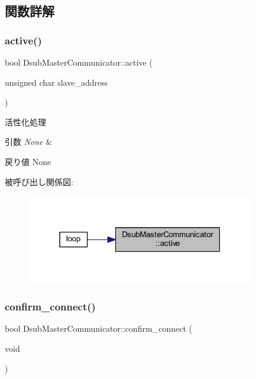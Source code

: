 \subsection{関数詳解}
\mbox{\label{class_dsub_master_communicator_a326013bfa0efeba26958317ce38706ac}} 
\subsubsection{\texorpdfstring{active()}{active()}}
{\footnotesize\ttfamily bool Dsub\+Master\+Communicator\+::active (\begin{DoxyParamCaption}\item[{unsigned char}]{slave\+\_\+address }\end{DoxyParamCaption})}



活性化処理 


\begin{DoxyParams}{引数}
{\em None} & \\
\hline
\end{DoxyParams}
\begin{DoxyReturn}{戻り値}
None 
\end{DoxyReturn}
被呼び出し関係図\+:
\nopagebreak
\begin{figure}[H]
\begin{center}
\leavevmode
\includegraphics[width=283pt]{class_dsub_master_communicator_a326013bfa0efeba26958317ce38706ac_icgraph}
\end{center}
\end{figure}
\mbox{\label{class_dsub_master_communicator_acb3acb522c4ff0099044fe9451008864}} 
\subsubsection{\texorpdfstring{confirm\_connect()}{confirm\_connect()}}
{\footnotesize\ttfamily bool Dsub\+Master\+Communicator\+::confirm\+\_\+connect (\begin{DoxyParamCaption}\item[{void}]{ }\end{DoxyParamCaption})}



